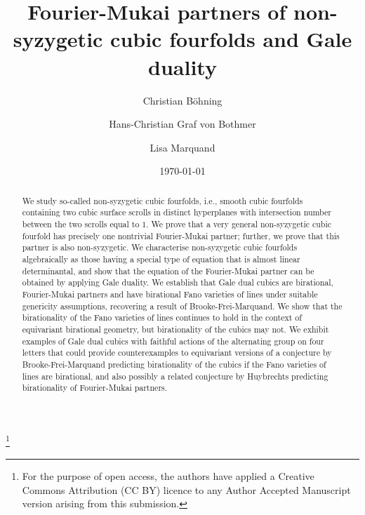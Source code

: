 \documentclass[11pt]{amsart}
\theoremstyle{plain}
\numberwithin{equation}{section}
\theoremstyle{definition}
\theoremstyle{remark}
\begin{document}
\title[Fourier-Mukai partners]{Fourier-Mukai partners of non-syzygetic cubic fourfolds and Gale duality}

\author[B\"ohning]{Christian B\"ohning}\thanks{For the purpose of open access, the authors have applied a Creative Commons Attribution (CC BY) licence to any Author Accepted Manuscript version arising from this submission.}
\address{Christian B\"ohning, Mathematics Institute, University of Warwick\\
Coventry CV4 7AL, England}

\author[von Bothmer]{Hans-Christian Graf von Bothmer}
\address{Hans-Christian Graf von Bothmer, Fachbereich Mathematik der Universit\"at Hamburg\\
Bundesstra\ss e 55\\
20146 Hamburg, Germany}

\author[Marquand]{Lisa Marquand}
\address{Lisa Marquand, Rutgers University\\
Hill Center, Busch Campus\\
110 Frelinghuysen Road\\
Piscataway\\
NJ 8019, USA}


\date{\today}


\begin{abstract}
We study so-called non-syzygetic cubic fourfolds, i.e., smooth cubic fourfolds containing two cubic surface scrolls in distinct hyperplanes with intersection number between the two scrolls equal to $1$. We prove that a very general non-syzygetic cubic fourfold has precisely one nontrivial Fourier-Mukai partner; further, we prove that this partner is also non-syzygetic. We characterise non-syzygetic cubic fourfolds algebraically as those having a special type of equation that is almost linear determinantal, and show that the equation of the Fourier-Mukai partner can be obtained by applying Gale duality. We establish that Gale dual cubics are birational, Fourier-Mukai partners and have birational Fano varieties of lines under suitable genericity assumptions, recovering a result of Brooke-Frei-Marquand. We show that the birationality of the Fano varieties of lines continues to hold in the context of equivariant birational geometry, but birationality of the cubics may not. We exhibit examples of Gale dual cubics with faithful actions of the alternating group on four letters that could provide counterexamples to equivariant versions of a conjecture by Brooke-Frei-Marquand predicting birationality of the cubics if the Fano varieties of lines are birational, and also possibly a related conjecture by Huybrechts predicting birationality of Fourier-Mukai partners. 
\end{abstract}
\end{document}
